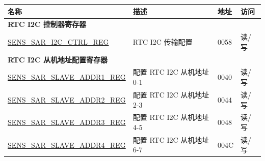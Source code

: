 \begin{longtable}{ | p{6cm} | p{7.2cm} | p{1.3cm} | p{1cm} | }
\hline\rowcolor{lightgray}
名称 & 描述 &  地址 & 访问 \\ \hline
\endhead
\multicolumn{4}{|l|}{\textbf{RTC I2C 控制器寄存器}} \\ \hline
\hyperref[regdesc:SENSSARI2CCTRLREG]{SENS\_SAR\_I2C\_CTRL\_REG} & RTC I2C 传输配置 & \hexprefix{}0058 & 读/写 \\ \hline
\multicolumn{4}{|l|}{\textbf{RTC I2C 从机地址配置寄存器}} \\ \hline
\hyperref[regdesc:SENSSARSLAVEADDR1REG]{SENS\_SAR\_SLAVE\_ADDR1\_REG} & 配置 RTC I2C 从机地址 0-1 & \hexprefix{}0040 & 读/写 \\ \hline
\hyperref[regdesc:SENSSARSLAVEADDR2REG]{SENS\_SAR\_SLAVE\_ADDR2\_REG} & 配置 RTC I2C 从机地址 2-3 & \hexprefix{}0044 & 读/写 \\ \hline
\hyperref[regdesc:SENSSARSLAVEADDR3REG]{SENS\_SAR\_SLAVE\_ADDR3\_REG} & 配置 RTC I2C 从机地址 4-5 & \hexprefix{}0048 & 读/写 \\ \hline
\hyperref[regdesc:SENSSARSLAVEADDR4REG]{SENS\_SAR\_SLAVE\_ADDR4\_REG} & 配置 RTC I2C 从机地址 6-7 & \hexprefix{}004C & 读/写 \\ \hline
\end{longtable}

